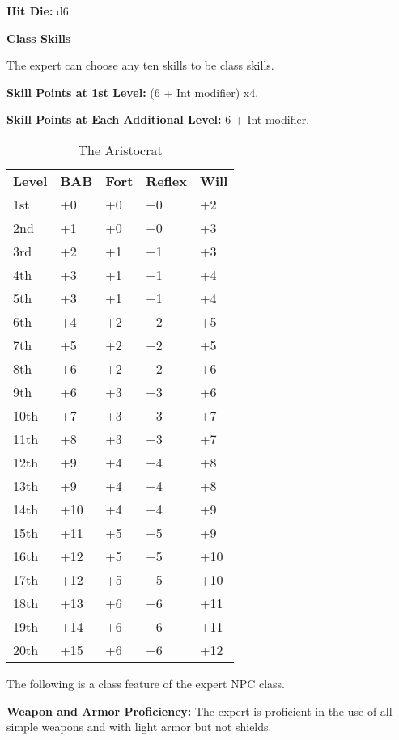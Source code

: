 
\textbf{Hit Die:} d6.

\textbf{Class Skills}

The expert can choose any ten skills to be class skills.

\textbf{Skill Points at 1st Level:} (6 + Int modifier) x4.

\textbf{Skill Points at Each Additional Level:} 6 + Int modifier.

\begin{table}[htb]
\caption{The Aristocrat}
\centering
\begin{tabular}{*{5}{l}}
\textbf{Level} & \textbf{BAB} & \textbf{Fort} & \textbf{Reflex} & \textbf{Will}\\
1st & +0 & +0 & +0 & +2 \\
2nd & +1 & +0 & +0 & +3 \\
3rd & +2 & +1 & +1 & +3 \\
4th & +3 & +1 & +1 & +4 \\
5th & +3 & +1 & +1 & +4 \\
6th & +4 & +2 & +2 & +5 \\
7th & +5 & +2 & +2 & +5 \\
8th & +6 & +2 & +2 & +6 \\
9th & +6 & +3 & +3 & +6 \\
10th & +7 & +3 & +3 & +7 \\
11th & +8 & +3 & +3 & +7 \\
12th & +9 & +4 & +4 & +8 \\
13th & +9 & +4 & +4 & +8 \\
14th & +10 & +4 & +4 & +9 \\
15th & +11 & +5 & +5 & +9 \\
16th & +12 & +5 & +5 & +10 \\
17th & +12 & +5 & +5 & +10 \\
18th & +13 & +6 & +6 & +11 \\
19th & +14 & +6 & +6 & +11 \\
20th & +15 & +6 & +6 & +12 \\
\end{tabular}
\end{table}

\ClassFeatures

The following is a class feature of the expert NPC class.

\textbf{Weapon and Armor Proficiency:} The expert is proficient in the use of all 
simple weapons and with light armor but not shields. 
